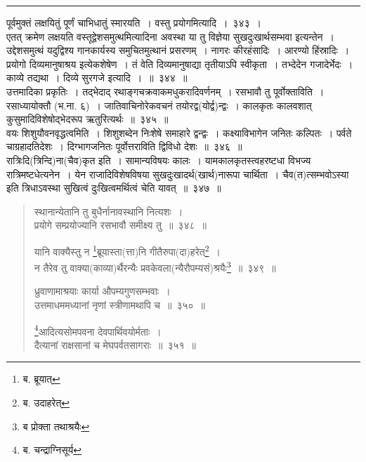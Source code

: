 \documentclass[11pt, openany]{book}
\begin{document}
\hrule

\vspace{2mm}
पूर्वमुक्तं लक्षयितुं पूर्णं चाभिधातुं स्मारयति~। {\qtt वस्तु प्रयोगमित्यादि}~।~३४३~।\\

एतत् क्रमेण लक्षयति वस्तूद्वेशसमुत्थमित्यादिना अवस्था या तु {\qtt विज्ञेया सुखदुःखार्थसम्भवा} इत्यन्तेन~। उद्देशसमुत्थं यदुद्विश्य गानकार्यस्य समुचितमुत्थानं प्रसरणम्~। नागरः कीरहंसादिः~। आरण्यो हिंस्रादिः~। प्रयोगो दिव्यमानुषाश्रय इत्येकशेषेण~। तं वेति दिव्यमानुषाद्या तृतीयाऽपि स्वीकृता~। तभ्देदेन गजादेर्भेदः~। काव्ये तद्यथा~। दिव्ये सुरगजे इत्यादि~।~॥~३४४~॥\\

{\qtt उत्तमादिका प्रकृतिः}~। तद्भेदाद् रथाङ्गचक्रवाकमधुकरादिवर्णनम्~। {\qtt रसभावौ तु पूर्वोक्ताविति}~। रसाध्यायोक्तौ (भ.ना. ६)~। जातिवाचिनोरेकवचनं तयोरद्व(योर्द्व)न्द्वः~। कालकृतः कालवशात् कुसुमादिविशेषोद्भेदरूप ऋतुरित्यर्थः~॥~३४५~॥\\

वयः शिशुयौवनवृद्धत्वमिति~। शिशुशब्देन निःशेषे समाहारे द्वन्द्वः~। कक्ष्याविभागेन जनितः कल्पितः~। पर्वते चाग्रहादतिदेशः~। दिग्भागजनितः पूर्वोत्तराविति {\qtt द्विविधो देशः}~॥~३४६~॥\\

{\qtt रात्रिःदि(त्रिन्दि)ना(चैव)कृत} इति~। सामान्यविषयः कालः~। यामकालकृतस्त्वहरष्टधा विभज्य रात्रिमष्टधेत्यनेन~। येन राजादिविशेषविषया सुखदुःखादर्थ(खार्थ)नारूपा चार्थिता~। चैव(त)त्सम्भवोऽस्या इति त्रिधाऽवस्था सुखित्वं दुःखित्वमर्थित्वं चेति यावत्~॥~३४७~॥

\newpage

\begin{quote}
{\na स्थानान्येतानि तु बुधैर्नानावस्थानि नित्यशः~।\\
 प्रयोगे सम्प्रयोज्यानि रसभावौ समीक्ष्य तु~॥~३४८~॥

 यानि वाक्यैस्तु न \renewcommand{\thefootnote}{1}\footnote{ब. ब्रूयात्}ब्रूयास्ता(त्ता)नि गीतैरुपा(दा)हरेत्\renewcommand{\thefootnote}{2}\footnote{ब. उदाहरेत्}~।\\
 न तैरेव तु वाक्या(काव्या)र्थैरन्यैः प्रवकेवला(न्यैरौपम्यसं)श्रयैः\renewcommand{\thefootnote}{3}\footnote{ब प्रोक्ता तथाश्रयैः}~॥~३४९~॥

 ध्रुवाणामाश्रयाः कार्या औपम्यगुणसम्भवाः~।\\
 उत्तमाधममध्यानां नृणां स्त्रीणामथापि च~॥~३५०~॥

 \renewcommand{\thefootnote}{4}\footnote{ब. चन्द्राग्निसूर्य\textendash }आदित्यसोमपवना देवपार्थिवयोर्मताः~।\\
 दैत्यानां राक्षसानां च मेघपर्वतसागराः~॥~३५१~॥}
\end{quote}
\end{document}
